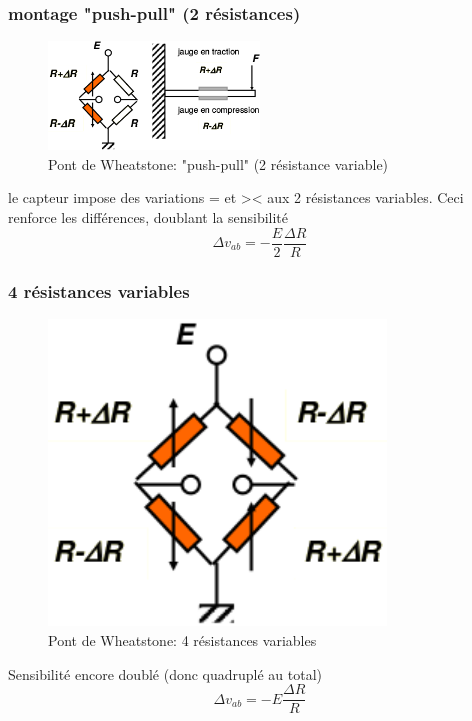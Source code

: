 \subsubsection{montage "push-pull" (2 résistances)}
\begin{figure}[H] 
	\centering 
	\includegraphics[width=0.5\textwidth,height=7\baselineskip,keepaspectratio]{ch4/image8} 
	\caption{Pont de Wheatstone: "push-pull" (2 résistance variable)} 
\end{figure}
	le capteur impose des variations = et >< aux 2 résistances variables. Ceci renforce les différences, doublant la sensibilité
	\[\Delta v_{ab}=-\frac{E}{2}\frac{\Delta R}{R}\]
\subsubsection{4 résistances variables}
\begin{figure}[H] 
	\centering 
	\includegraphics[width=0.8\textwidth,height=7\baselineskip,keepaspectratio]{ch4/image9} 
	\caption{Pont de Wheatstone: 4 résistances variables} 
\end{figure}
	Sensibilité encore doublé (donc quadruplé au total)
	\[\Delta v_{ab}=-E\frac{\Delta R}{R}\]

